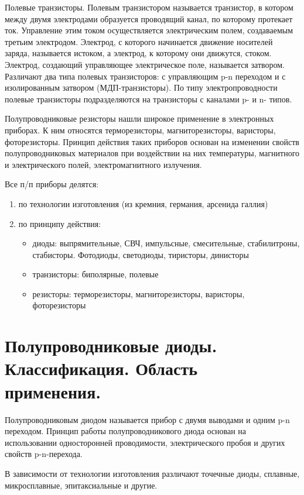 \documentclass[unicode, 12pt, a4paper, oneside]{article}
\begin{document}
Полевые транзисторы. Полевым транзистором называется транзистор, в котором между двумя электродами образуется проводящий канал, по которому протекает ток. Управление этим током осуществляется электрическим полем, создаваемым третьим электродом. Электрод, с которого начинается движение носителей заряда, называется истоком, а электрод, к которому они движутся, стоком. Электрод, создающий управляющее электрическое поле, называется затвором. Различают два типа полевых транзисторов: с управляющим p-n переходом и с изолированным затвором (МДП-транзисторы). По типу электропроводности полевые транзисторы подразделяются на транзисторы с каналами p- и n- типов.

Полупроводниковые резисторы нашли широкое применение в электронных приборах. К ним относятся терморезисторы, магниторезисторы, варисторы, фоторезисторы. Принцип действия таких приборов основан на изменении свойств полупроводниковых материалов при воздействии на них температуры, магнитного и электрического полей, электромагнитного излучения.

Все п/п приборы делятся:
\begin{enumerate}
\item по технологии изготовления (из кремния, германия, арсенида галлия)
\item по принципу действия:
	\begin{itemize}
	\item диоды: выпрямительные, СВЧ, импульсные, смесительные, стабилитроны, стабисторы. Фотодиоды, светодиоды, тиристоры, динисторы
	\item транзисторы: биполярные, полевые
	\item резисторы: терморезисторы, магниторезисторы, варисторы, фоторезисторы
	\end{itemize}
\end{enumerate}


\section{Полупроводниковые диоды. Классификация. Область применения.}

Полупроводниковым диодом называется прибор с двумя выводами и одним p-n переходом. Принцип работы полупроводникового диода основан на использовании односторонней проводимости, электрического пробоя и других свойств p-n-перехода.

В зависимости от технологии изготовления различают точечные диоды, сплавные, микросплавные, эпитаксиальные и другие.
\end{document}
